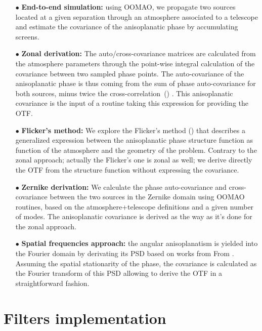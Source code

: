 \documentclass[12pt]{article}
\begin{document}
\begin{itemize}
	\item[$\bullet$] \textbf{End-to-end simulation:} using OOMAO, we propagate two sources located at a given separation through an atmosphere associated to a telescope and estimate the covariance of the anisoplanatic phase by accumulating screens.
	
	\item[$\bullet$] \textbf{Zonal derivation:} The auto/cross-covariance matrices are calculated from the atmosphere parameters through the point-wise integral calculation of the covariance between two sampled phase points. The auto-covariance of the anisoplanatic phase is thus coming from the sum of phase auto-covariance for both sources, minus twice the cross-correlation~(\cite{Fusco2000}) . This anisoplanatic covariance is the input of a routine taking this expression for providing the OTF.
	
\item[$\bullet$] \textbf{Flicker's method:} We explore the Flicker's method (\cite{Flicker2008}) that describes a generalized expression between the anisoplanatic phase structure function as function of the atmosphere and the geometry of the problem. Contrary to the zonal approach; actually the Flicker's one is zonal as well; we derive directly the OTF from the structure function without expressing the covariance.
	
\item[$\bullet$] \textbf{Zernike derivation:} We calculate the phase auto-covariance and cross-covariance between the two sources in the Zernike domain using OOMAO routines, based on the atmosphere+telescope definitions and a given number of modes. The anisoplanatic covariance is derived as the way as it's done for the zonal approach.
	
\item[$\bullet$] \textbf{Spatial frequencies approach:} the angular anisoplanatism is yielded into the Fourier domain by derivating its PSD based on works from  From \cite{Rigaut1998,Flicker2008}. Assuming the spatial stationarity of the phase, the covariance is calculated as the Fourier transform of this PSD allowing to derive the OTF in a straightforward fashion.
	
\end{itemize}

\section{Filters implementation}
\end{document}
